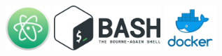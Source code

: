 \begin{figure}[ht]
  \centering
  \newcommand{\developmentToolsLogosHeight}{1.7cm}
  \includegraphics[height=\developmentToolsLogosHeight]{assets/tools/development/atom.png}
  \includegraphics[height=\developmentToolsLogosHeight]{assets/tools/development/bash.png}
  \includegraphics[height=\developmentToolsLogosHeight]{assets/tools/development/docker.png}

\end{figure}

